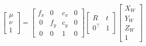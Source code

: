 \begin{equation}
  \left[\begin{array}{c}\mu\\\nu\\1\end{array}\right]
   = 
  \left[
    \begin{matrix}
      f_x & 0 & c_x & 0 \\\
      0 & f_y & c_y & 0 \\\
      0 & 0 & 1 & 0
    \end{matrix}
  \right]
  \left[
    \begin{array}{cc}R&t\\0^\top&1\end{array}
  \right]
  \left[
    \begin{array}{c}X_W\\Y_W\\Z_W\\1\end{array}
  \right]
\end{equation}

